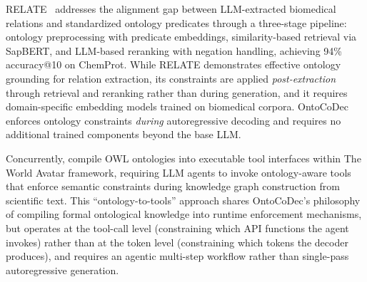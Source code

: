 
RELATE~\cite{olasunkanmi2025relate} addresses the alignment gap between LLM-extracted biomedical relations and standardized ontology predicates through a three-stage pipeline: ontology preprocessing with predicate embeddings, similarity-based retrieval via SapBERT, and LLM-based reranking with negation handling, achieving 94\% accuracy@10 on ChemProt.
While RELATE demonstrates effective ontology grounding for relation extraction, its constraints are applied \emph{post-extraction} through retrieval and reranking rather than during generation, and it requires domain-specific embedding models trained on biomedical corpora.
OntoCoDec enforces ontology constraints \emph{during} autoregressive decoding and requires no additional trained components beyond the base LLM.



Concurrently, \citet{zhou2026ontologytools} compile OWL ontologies into executable tool interfaces within The World Avatar framework, requiring LLM agents to invoke ontology-aware tools that enforce semantic constraints during knowledge graph construction from scientific text.
This ``ontology-to-tools'' approach shares OntoCoDec's philosophy of compiling formal ontological knowledge into runtime enforcement mechanisms, but operates at the tool-call level (constraining which API functions the agent invokes) rather than at the token level (constraining which tokens the decoder produces), and requires an agentic multi-step workflow rather than single-pass autoregressive generation.


